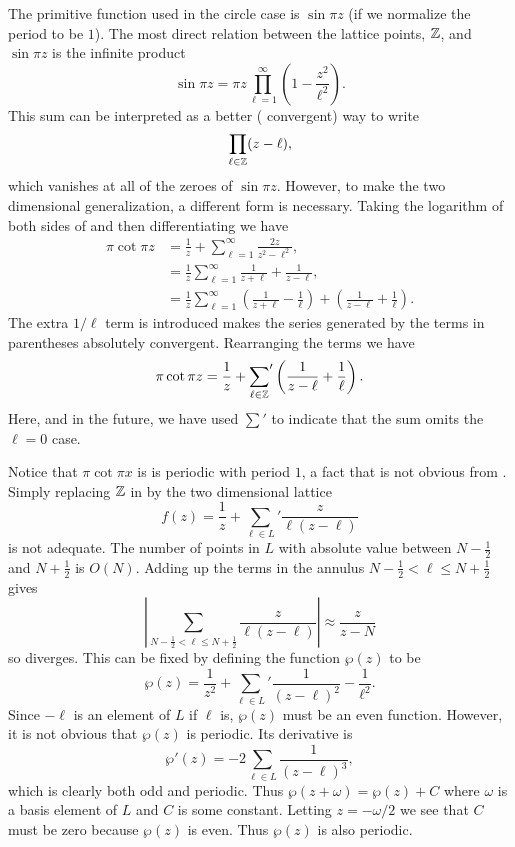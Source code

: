 The primitive function used in the circle case is $\sin \pi z$ (if we
normalize the period to be $1$).  The most direct relation between the
lattice points, $\mathbb{Z}$, and $\sin \pi z$ is the infinite product
\begin{equation}\label{Ell:Sin:Prod:Eq}
\sin \pi z = 
\pi z \prod^{\infty}_{\ell=1}\left(1 - \frac{z^2}{\ell^2}\right).
\end{equation}
This sum can be interpreted as a better (\ie{} convergent) way to
write
\[
\prod_{\ell \in \mathbb{Z}}(z - \ell),
\]
which vanishes at all of the zeroes of $\sin \pi z$.  However, to make
the two dimensional generalization, a different form is necessary.
Taking the logarithm of both sides of  and
then differentiating we have 
\[
\begin{aligned}
\pi \cot \pi z & = \frac{1}{z} + 
\sum_{\ell = 1}^{\infty} \frac{2z}{z^2 - \ell^2}, \\
& = \frac{1}{z}
\sum_{\ell = 1}^{\infty} \frac{1}{z + \ell} + \frac{1}{z - \ell}, \\
& = \frac{1}{z}
\sum_{\ell = 1}^{\infty} 
 \left(\frac{1}{z + \ell} - \frac{1}{\ell}\right)
 +\left(\frac{1}{z - \ell} + \frac{1}{\ell}\right).
\end{aligned}
\]
The extra $1/\ell$ term is introduced makes the series generated by
the terms in parentheses absolutely convergent.  Rearranging the terms
we have
\begin{equation} \label{Ell:Cot:Sum:Eq}
\pi \cot \pi z = \frac{1}{z} +
{\sum_{\ell \in \mathbb{Z}}}'\left(\frac{1}{z - \ell} + \frac{1}{\ell}\right).
\end{equation}
Here, and in the future, we have used $\sum'$ to indicate that the sum
omits the $\ell = 0$ case.

Notice that $\pi \cot \pi x$ is is periodic with period $1$, a fact
that is not obvious from .  Simply replacing
$\mathbb{Z}$ in  by the two dimensional lattice
\begin{equation}\label{Ell:Lat:Div:Eq}  
f(z)= \frac{1}{z} + \sum_{\ell \in L}' \frac{z}{\ell(z - \ell)}
\end{equation}
is not adequate.  The number of points in $L$ with absolute value
between $N-\frac{1}{2}$ and $N+\frac{1}{2}$ is $O(N)$.  Adding up the
terms in the annulus $N-\frac{1}{2} < \ell \le N+\frac{1}{2}$ gives
\[
\left| \sum_{N-\frac{1}{2} < \ell \le N+\frac{1}{2}}\frac{z}{\ell(z -
\ell)} \right|
\approx \frac{z}{z - N}
\]
so  diverges.  This can be fixed by defining the
function $\wp(z)$ to be 
\[
\wp(z) = \frac{1}{z^2} + 
{\sum_{\ell \in L}}' \frac{1}{(z - \ell)^2} - \frac{1}{\ell^2}.
\]
Since $-\ell$ is an element of $L$ if $\ell$ is, $\wp(z)$ must be an
even function.  However, it is not obvious that $\wp(z)$ is periodic.
Its derivative is
\[
\wp'(z) = -2 {\sum_{\ell \in L}}\frac{1}{(z - \ell)^3},
\]
which is clearly both odd and periodic.  Thus $\wp(z + \omega) = \wp(z) +
C$ where $\omega$ is a basis element of $L$ and $C$ is some constant.
Letting $z = - \omega/2$ we see that $C$ must be zero because $\wp(z)$
is even.  Thus $\wp(z)$ is also periodic.

